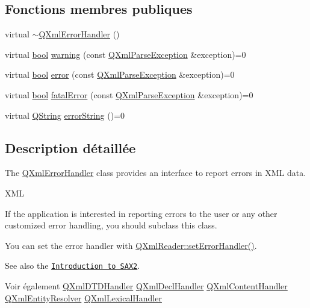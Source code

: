 \subsection*{Fonctions membres publiques}
\begin{DoxyCompactItemize}
\item 
virtual \hyperlink{class_q_xml_error_handler_a53b73fe1f25bf090ca804330f3fa1ab6}{$\sim$\+Q\+Xml\+Error\+Handler} ()
\item 
virtual \hyperlink{qglobal_8h_a1062901a7428fdd9c7f180f5e01ea056}{bool} \hyperlink{class_q_xml_error_handler_a79ae0cce3316a76b7777c6e90b101afe}{warning} (const \hyperlink{class_q_xml_parse_exception}{Q\+Xml\+Parse\+Exception} \&exception)=0
\item 
virtual \hyperlink{qglobal_8h_a1062901a7428fdd9c7f180f5e01ea056}{bool} \hyperlink{class_q_xml_error_handler_aa7e25c4198fa16a0312fd48e5718217c}{error} (const \hyperlink{class_q_xml_parse_exception}{Q\+Xml\+Parse\+Exception} \&exception)=0
\item 
virtual \hyperlink{qglobal_8h_a1062901a7428fdd9c7f180f5e01ea056}{bool} \hyperlink{class_q_xml_error_handler_aaa8c1ad1b42a5257cf2344c7fe101797}{fatal\+Error} (const \hyperlink{class_q_xml_parse_exception}{Q\+Xml\+Parse\+Exception} \&exception)=0
\item 
virtual \hyperlink{class_q_string}{Q\+String} \hyperlink{class_q_xml_error_handler_a7b265803d41782e6207b497fe09beff0}{error\+String} ()=0
\end{DoxyCompactItemize}


\subsection{Description détaillée}
The \hyperlink{class_q_xml_error_handler}{Q\+Xml\+Error\+Handler} class provides an interface to report errors in X\+M\+L data. 

X\+M\+L

If the application is interested in reporting errors to the user or any other customized error handling, you should subclass this class.

You can set the error handler with \hyperlink{class_q_xml_reader_a97cab92522d1ceb8f6da94a161a72ee2}{Q\+Xml\+Reader\+::set\+Error\+Handler()}.

See also the \href{xml.html#introSAX2}{\tt Introduction to S\+A\+X2}.

\begin{DoxySeeAlso}{Voir également}
\hyperlink{class_q_xml_d_t_d_handler}{Q\+Xml\+D\+T\+D\+Handler} \hyperlink{class_q_xml_decl_handler}{Q\+Xml\+Decl\+Handler} \hyperlink{class_q_xml_content_handler}{Q\+Xml\+Content\+Handler} \hyperlink{class_q_xml_entity_resolver}{Q\+Xml\+Entity\+Resolver} \hyperlink{class_q_xml_lexical_handler}{Q\+Xml\+Lexical\+Handler} 
\end{DoxySeeAlso}


